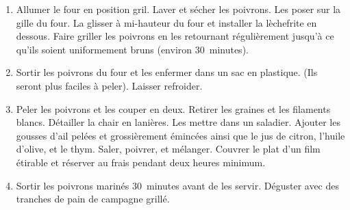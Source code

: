 
\begin{ingredients}
\end{ingredients}


\begin{recipe}
  \begin{enumerate}

  \item Allumer le four en position gril.  Laver et sécher les
    poivrons.  Les poser sur la gille du four.  La glisser à
    mi-hauteur du four et installer la lèchefrite en dessous.  Faire
    griller les poivrons en les retournant régulièrement jusqu'à ce
    qu'ils soient uniformement bruns (environ 30~minutes).

  \item Sortir les poivrons du four et les enfermer dans un sac en
    plastique.  (Ils seront plus faciles à peler).  Laisser refroider.

  \item Peler les poivrons et les couper en deux.  Retirer les graines
    et les filaments blancs.  Détailler la chair en lanières.   Les
    mettre dans un saladier.  Ajouter les gousses d'ail pelées et
    grossièrement émincées ainsi que le jus de citron, l'huile
    d'olive, et le thym.  Saler, poivrer, et mélanger.  Couvrer le
    plat d'un film étirable et réserver au frais pendant deux heures
    minimum.

  \item Sortir les poivrons marinés 30~minutes avant de les servir.
    Déguster avec des tranches de pain de campagne grillé.

  \end{enumerate}
\end{recipe}

